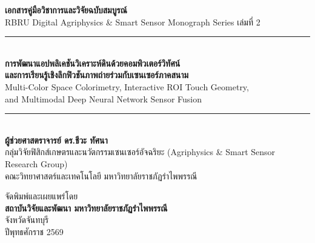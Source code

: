 \begin{titlepage}
\begin{center}

\vspace*{0.5cm}

{\fontsize{18}{24}\selectfont\bfseries\color{rbruNavy} เอกสารคู่มือวิชาการและวิจัยฉบับสมบูรณ์}\\[0.4cm]
{\fontsize{14}{18}\selectfont\color{rbruSlate} RBRU Digital Agriphysics \& Smart Sensor Monograph Series เล่มที่ 2}\\[1.2cm]

{\color{rbruGold}\rule{0.8\textwidth}{2pt}}\\[0.8cm]

{\fontsize{22}{28}\selectfont\bfseries\color{rbruNavy} การพัฒนาแอปพลิเคชันวิเคราะห์ดินด้วยคอมพิวเตอร์วิทัศน์}\\[0.4cm]
{\fontsize{18}{24}\selectfont\bfseries\color{rbruTeal} และการเรียนรู้เชิงลึกฟิวชันภาพถ่ายร่วมกับเซนเซอร์ภาคสนาม}\\[0.5cm]
{\fontsize{13}{18}\selectfont\color{rbruSlate} Multi-Color Space Colorimetry, Interactive ROI Touch Geometry,}\\[0.2cm]
{\fontsize{13}{18}\selectfont\color{rbruSlate} and Multimodal Deep Neural Network Sensor Fusion}\\[0.8cm]

{\color{rbruGold}\rule{0.8\textwidth}{2pt}}\\[1.8cm]

{\fontsize{16}{22}\selectfont\bfseries\color{rbruNavy} ผู้ช่วยศาสตราจารย์ ดร.ชีวะ ทัศนา}\\[0.3cm]
{\fontsize{13}{17}\selectfont กลุ่มวิจัยฟิสิกส์เกษตรและนวัตกรรมเซนเซอร์อัจฉริยะ (Agriphysics \& Smart Sensor Research Group)}\\[0.2cm]
{\fontsize{13}{17}\selectfont คณะวิทยาศาสตร์และเทคโนโลยี มหาวิทยาลัยราชภัฏรำไพพรรณี}\\[2.5cm]

\vfill

{\fontsize{12}{16}\selectfont จัดพิมพ์และเผยแพร่โดย}\\[0.2cm]
{\fontsize{13}{18}\selectfont\bfseries สถาบันวิจัยและพัฒนา มหาวิทยาลัยราชภัฏรำไพพรรณี}\\[0.2cm]
{\fontsize{12}{16}\selectfont จังหวัดจันทบุรี}\\[0.3cm]
{\fontsize{12}{16}\selectfont ปีพุทธศักราช 2569}

\end{center}
\end{titlepage}
